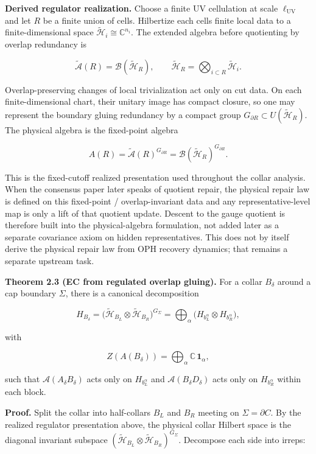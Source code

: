 \textbf{Derived regulator realization.} Choose a finite UV cellulation at scale \(\ell_{\mathrm{UV}}\) and let \(R\) be a finite union of cells. Hilbertize each cell\textquotesingle s finite local data to a finite-dimensional space \(\tilde{\mathcal H}_i\cong \mathbb C^{n_i}\). The extended algebra before quotienting by overlap redundancy is

\[
\widetilde{\mathcal A}(R)=\mathcal B(\tilde{\mathcal H}_R),
\qquad
\tilde{\mathcal H}_R=\bigotimes_{i\subset R}\tilde{\mathcal H}_i.
\]

Overlap-preserving changes of local trivialization act only on cut data. On each finite-dimensional chart, their unitary image has compact closure, so one may represent the boundary gluing redundancy by a compact group \(G_{\partial R}\subset U(\tilde{\mathcal H}_R)\). The physical algebra is the fixed-point algebra

\[
A(R)=\widetilde{\mathcal A}(R)^{G_{\partial R}}
=\mathcal B(\tilde{\mathcal H}_R)^{G_{\partial R}}.
\]

This is the fixed-cutoff realized presentation used throughout the collar analysis.
When the consensus paper later speaks of quotient repair, the physical repair law is defined on
this fixed-point / overlap-invariant data and any representative-level map is only a lift of that
quotient update. Descent to the gauge quotient is therefore built into the physical-algebra
formulation, not added later as a separate covariance axiom on hidden representatives. This does
not by itself derive the physical repair law from OPH recovery dynamics; that remains a separate
upstream task.

\textbf{Theorem 2.3 (EC from regulated overlap gluing).} For a collar \(B_\delta\) around a cap boundary \(\Sigma\), there is a canonical decomposition

\[
H_{B_\delta} = \bigl(\tilde{\mathcal H}_{B_L}\otimes \tilde{\mathcal H}_{B_R}\bigr)^{G_\Sigma}
= \bigoplus_{\alpha}
\bigl(H_{b_L^{\alpha}} \otimes H_{b_R^{\alpha}}\bigr),
\]

with

\[
Z(A(B_\delta)) = \bigoplus_\alpha \mathbb C\,\mathbf 1_\alpha,
\]

such that \(\mathcal{A}(A_\delta B_\delta)\) acts only on \(H_{b_L^\alpha}\) and \(\mathcal{A}(B_\delta D_\delta)\) acts only on \(H_{b_R^\alpha}\) within each block.

\textbf{Proof.} Split the collar into half-collars \(B_L\) and \(B_R\) meeting on \(\Sigma = \partial C\). By the realized regulator presentation above, the physical collar Hilbert space is the diagonal invariant subspace \((\tilde{\mathcal H}_{B_L} \otimes \tilde{\mathcal H}_{B_R})^{G_\Sigma}\). Decompose each side into irreps:

